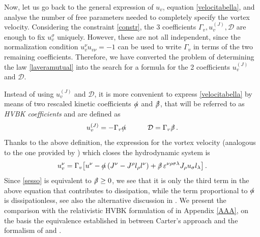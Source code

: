 \documentclass[preprints,article,accept,moreauthors,pdftex]{mdpi}
\newcommand{\spc}{\quad \quad \quad}
\begin{document}
Now, let us go back to the general expression of $u_v$, equation \eqref{velocitabella}, and analyse the number of free parameters needed to completely specify the vortex velocity. 
Considering the constraint \eqref{constr}, the 3 coefficients $\Gamma_v,u_v^{(J)},\mathcal{D}$ are enough to fix $u_v^\sigma$ uniquely. However, these are not all independent, since the normalization condition $u_v^\nu u_{v\nu}=-1$ can be used to write $\Gamma_v$ in terms of the two remaining coefficients. Therefore, we have converted the problem of determining the law \eqref{laveramutual} into the search for a formula for the 2 coefficients $u_v^{(J)}$ and $\mathcal{D}$. 

Instead of using $u_v^{(J)}$ and $\mathcal{D}$, it is more convenient to express \eqref{velocitabella} by means of two rescaled kinetic coefficients $\slashed{\alpha}$ and $\slashed{\beta}$, that will be referred to as \textit{HVBK coefficients} and are defined as
\begin{equation}\label{pupazzi}
u_v^{(J)} = -\Gamma_v \slashed{\alpha} \spc  \mathcal{D}=\Gamma_v \slashed{\beta} \, .
\end{equation}
Thanks to the above definition, the expression for the vortex velocity (analogous to the one provided by  \citet{GusakovHVBK}) which closes the hydrodynamic system is 
\begin{equation}
\label{lacentrale}
u_v^\nu = \Gamma_v \big[ u^\nu -\slashed{\alpha} \, (J^\nu-J^\rho l_\rho l^\nu) + \slashed{\beta} \, \varepsilon^{\nu \rho \sigma \lambda} J_\rho u_\sigma l_\lambda \big] \, .
\end{equation}
Since \eqref{sesso} is equivalent to $\slashed{\beta} \geq 0$, we see that it is only the third term in the above equation that contributes to dissipation, while the term proportional to  $\slashed{\alpha}$ is dissipationless, see also the alternative discussion in \citep{GusakovHVBK}. 
We present the comparison with the relativistic HVBK formulation of \citet{GusakovHVBK} in Appendix \ref{AAA}, on the basis the equivalence established in \cite{Termo} between Carter's approach and the formalism of \citet{Son2001} and \citet{Gusakov2007}. 
\end{document}

